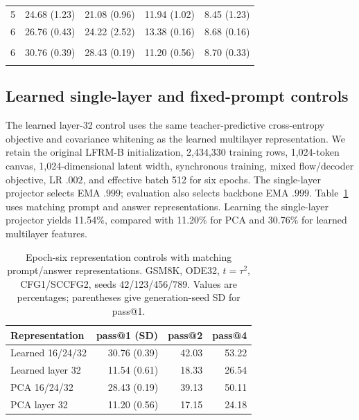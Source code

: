 \documentclass{article}
\newenvironment{revision}{\begingroup\color{blue}}{\endgroup}
\begin{document}
\begin{table}[htbp]
\begin{tabular}{@{}rrrrr@{}}
5 & 24.68 {\scriptsize (1.23)} & 21.08 {\scriptsize (0.96)} & 11.94 {\scriptsize (1.02)} & 8.45 {\scriptsize (1.23)} \\
6 & 26.76 {\scriptsize (0.43)} & 24.22 {\scriptsize (2.52)} & 13.38 {\scriptsize (0.16)} & 8.68 {\scriptsize (0.16)} \\
\addlinespace
\multicolumn{5}{@{}l}{Epoch-six summary: $t=\tau^2$, four seeds}\\
6 & 30.76 {\scriptsize (0.39)} & 28.43 {\scriptsize (0.19)} & 11.20 {\scriptsize (0.56)} & 8.70 {\scriptsize (0.33)} \\
\addlinespace
\bottomrule
\end{tabular}
\end{table}

\clearpage
\begin{revision}
\subsection{Learned single-layer and fixed-prompt controls}
\label{app:fixedprompt}
The learned layer-32 control uses the same teacher-predictive cross-entropy objective and covariance whitening as the learned multilayer representation. We retain the original LFRM-B initialization, 2,434,330 training rows, 1,024-token canvas, 1,024-dimensional latent width, synchronous training, mixed flow/decoder objective, LR $.002$, and effective batch 512 for six epochs. The single-layer projector selects EMA $.999$; evaluation also selects backbone EMA $.999$. Table~\ref{tab:representationcontrols} uses matching prompt and answer representations. Learning the single-layer projector yields 11.54\%, compared with 11.20\% for PCA and 30.76\% for learned multilayer features.
\begin{table}[htbp]\color{blue}\centering\small
\caption{Epoch-six representation controls with matching prompt/answer representations. GSM8K, ODE32, $t=\tau^2$, CFG1/SCCFG2, seeds 42/123/456/789. Values are percentages; parentheses give generation-seed SD for pass@1.}
\label{tab:representationcontrols}
\begin{tabular}{@{}lrrr@{}}\toprule
Representation & pass@1 (SD) & pass@2 & pass@4\\\midrule
Learned 16/24/32 & 30.76 (0.39) & 42.03 & 53.22\\
Learned layer 32 & 11.54 (0.61) & 18.33 & 26.54\\
PCA 16/24/32 & 28.43 (0.19) & 39.13 & 50.11\\
PCA layer 32 & 11.20 (0.56) & 17.15 & 24.18\\\bottomrule
\end{tabular}
\end{table}


\end{revision}
\end{document}
